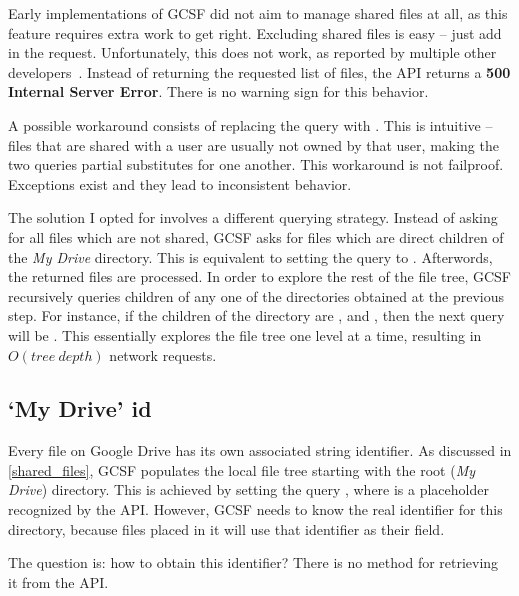 Early implementations of GCSF did not aim to manage shared files at all, as this feature requires extra work to get right. Excluding shared files is easy -- just add  in the request. Unfortunately, this does not work, as reported by multiple other developers~\cite{shared_with_me_error,shared_with_me_error2,shared_with_me_error3}. Instead of returning the requested list of files, the API returns a \textbf{500 Internal Server Error}. There is no warning sign for this behavior.

A possible workaround consists of replacing the query with . This is intuitive -- files that are shared with a user are usually not owned by that user, making the two queries partial substitutes for one another. This workaround is not failproof. Exceptions exist and they lead to inconsistent behavior.

The solution I opted for involves a different querying strategy. Instead of asking for all files which are not shared, GCSF asks for files which are direct children of the \emph{My Drive} directory. This is equivalent to setting the query to . Afterwords, the returned files are processed. In order to explore the rest of the file tree, GCSF recursively queries children of any one of the directories obtained at the previous step. For instance, if the children of the  directory are ,  and , then the next query will be . This essentially explores the file tree one level at a time, resulting in $ O(tree~depth) $ network requests.

\subsection{`My Drive' id}

Every file on Google Drive has its own associated string identifier. As discussed in \ref{shared_files}, GCSF populates the local file tree starting with the root (\emph{My Drive}) directory. This is achieved by setting the query , where  is a placeholder recognized by the API. However, GCSF needs to know the real identifier for this directory, because files placed in it will use that identifier as their  field.

The question is: how to obtain this identifier? There is no method for retrieving it from the API.

